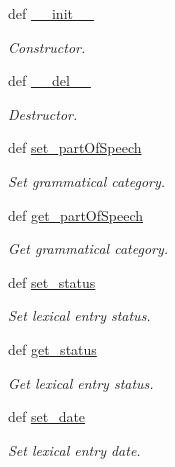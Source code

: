 \begin{DoxyCompactItemize}
\item 
def \hyperlink{classlmf_1_1src_1_1core_1_1lexical__entry_1_1_lexical_entry_a99f46e253fd0abb1999d14f4eac102d5}{\+\_\+\+\_\+init\+\_\+\+\_\+}
\begin{DoxyCompactList}\small\item\em Constructor. \end{DoxyCompactList}\item 
def \hyperlink{classlmf_1_1src_1_1core_1_1lexical__entry_1_1_lexical_entry_a7aef35b0a044411935c2fe5d6877699f}{\+\_\+\+\_\+del\+\_\+\+\_\+}
\begin{DoxyCompactList}\small\item\em Destructor. \end{DoxyCompactList}\item 
def \hyperlink{classlmf_1_1src_1_1core_1_1lexical__entry_1_1_lexical_entry_ad9aec09ea7a1664650e8667b5d161c84}{set\+\_\+part\+Of\+Speech}
\begin{DoxyCompactList}\small\item\em Set grammatical category. \end{DoxyCompactList}\item 
def \hyperlink{classlmf_1_1src_1_1core_1_1lexical__entry_1_1_lexical_entry_a198ccaea559997368ea7b0f9a198707f}{get\+\_\+part\+Of\+Speech}
\begin{DoxyCompactList}\small\item\em Get grammatical category. \end{DoxyCompactList}\item 
def \hyperlink{classlmf_1_1src_1_1core_1_1lexical__entry_1_1_lexical_entry_ab991806fefc45e2cc5f3bf88ee3d6604}{set\+\_\+status}
\begin{DoxyCompactList}\small\item\em Set lexical entry status. \end{DoxyCompactList}\item 
def \hyperlink{classlmf_1_1src_1_1core_1_1lexical__entry_1_1_lexical_entry_a616dd1fa3fbfc0db546832fd9ba5b3e2}{get\+\_\+status}
\begin{DoxyCompactList}\small\item\em Get lexical entry status. \end{DoxyCompactList}\item 
def \hyperlink{classlmf_1_1src_1_1core_1_1lexical__entry_1_1_lexical_entry_a37728197c726801ebfed551feb0d9fa7}{set\+\_\+date}
\begin{DoxyCompactList}\small\item\em Set lexical entry date. \end{DoxyCompactList}\item 

\end{DoxyCompactItemize}
